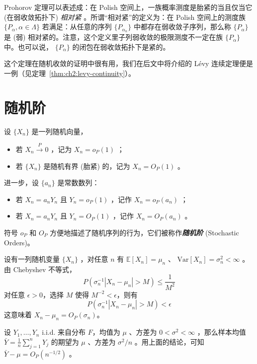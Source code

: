 \begin{remark}

  Prohorov 定理可以表述成：在 Polish 空间上，一族概率测度是胎紧的当且仅当它 (在弱收敛拓扑下) \emph{相对紧} 。所谓``相对紧''的定义为：在 Polish 空间上的测度族 $\{P_\alpha,\alpha\in\Lambda\}$ 若满足：从任意的序列 $\{P_{\alpha_n}\}$ 中都存在弱收敛子序列，那么称 $\{P_\alpha\}$ 是 (弱) 相对紧的。注意，这个定义里子列弱收敛的极限测度不一定在族 $\{P_\alpha\}$ 中。也可以说， $\{P_\alpha\}$ 的闭包在弱收敛拓扑下是紧的。
\end{remark}

这个定理在随机收敛的证明中很有用，我们在后文中将介绍的 Lévy 连续定理便是一例（见定理~\ref{thm:ch2:levy-continuity}）。

\section{随机阶}


\begin{definition}
  
设 $\{X_n\}$ 是一列随机向量，

\begin{itemize}
\tightlist
\item
  若 $X_n\overset P\to 0$ ，记为 $X_n=o_P(1)$ ；
\item
  若 $\{X_n\}$ 是随机有界 (胎紧) 的，记为 $X_n=O_P(1)$ 。
\end{itemize}


进一步，设 $\{a_n\}$ 是常数数列：

\begin{itemize}
\tightlist
\item
  若 $X_n=a_nY_n$ 且 $Y_n=o_P(1)$ ，记作 $X_n=o_P(a_n)$ ；
\item
  若 $X_n=a_nY_n$ 且 $Y_n=O_P(1)$ ，记作 $X_n=O_P(a_n)$ 。
\end{itemize}


符号 $o_P$ 和 $O_P$ 方便地描述了随机序列的行为，它们被称作\textbf{\emph{随机阶}} (Stochastic Orders)。
\end{definition}

\begin{example}
设有一列随机变量 $\{X_n\}$ ，对任意 $n$ 有 $\mathbb{E}[X_n]=\mu_n$ 、 $\mathrm{Var}[X_n]=\sigma_n^2<\infty$ 。由 Chebyshev 不等式，
\[P\left(\sigma_n^{-1}|X_n - \mu_n| > M\right) \le  \frac{1}{M^2}\]
对任意 $\epsilon > 0$，选择 $M$ 使得 $M^{-2} < \epsilon$，则有
\[P\left(\sigma_n^{-1}|X_n - \mu_n| > M\right) < \epsilon\]
这意味着 $X_n-\mu_n=O_P(\sigma_n)$。

设 $Y_{1}, \ldots , Y_{n}$ i.i.d. 来自分布 $F$，均值为 $\mu$ 、方差为 $0<\sigma^2<\infty$ ，那么样本均值 $\bar Y=\frac1n\sum\limits_{j=1}^n Y_j$ 的期望为 $\mu$ 、方差为 $\sigma^2/n$ 。用上面的结论，可知 $\bar{Y}-\mu=O_P(n^{-1/2})$ 。


\end{example}

